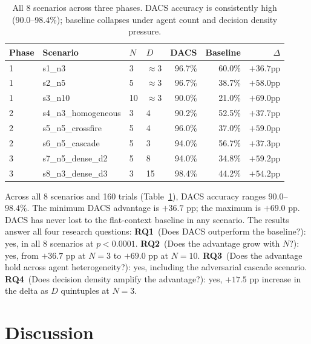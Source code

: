 \documentclass{article}
\begin{document}
\begin{table}[t]
\caption{All 8 scenarios across three phases.
DACS accuracy is consistently high (90.0--98.4\%); baseline collapses
under agent count and decision density pressure.}
\label{tab:all}
\centering
\small
\begin{tabular}{llllrrr}
\toprule
Phase & Scenario & $N$ & $D$ & DACS & Baseline & $\Delta$ \\
\midrule
1 & s1\_n3                & 3  & $\approx$3 & 96.7\% & 60.0\% & $+36.7$pp \\
1 & s2\_n5                & 5  & $\approx$3 & 96.7\% & 38.7\% & $+58.0$pp \\
1 & s3\_n10               & 10 & $\approx$3 & 90.0\% & 21.0\% & $+69.0$pp \\
2 & s4\_n3\_homogeneous   & 3  & 4          & 90.2\% & 52.5\% & $+37.7$pp \\
2 & s5\_n5\_crossfire     & 5  & 4          & 96.0\% & 37.0\% & $+59.0$pp \\
2 & s6\_n5\_cascade       & 5  & 3          & 94.0\% & 56.7\% & $+37.3$pp \\
3 & s7\_n5\_dense\_d2     & 5  & 8          & 94.0\% & 34.8\% & $+59.2$pp \\
3 & s8\_n3\_dense\_d3     & 3  & 15         & 98.4\% & 44.2\% & $+54.2$pp \\
\bottomrule
\end{tabular}
\end{table}

Across all 8 scenarios and 160 trials (Table~\ref{tab:all}), DACS
accuracy ranges $90.0$--$98.4\%$.
The minimum DACS advantage is $+36.7$ pp; the maximum is $+69.0$ pp.
DACS has never lost to the flat-context baseline in any scenario.
The results answer all four research questions:
\textbf{RQ1}~(Does DACS outperform the baseline?): yes, in all 8
scenarios at $p<0.0001$.
\textbf{RQ2}~(Does the advantage grow with $N$?): yes, from
$+36.7$ pp at $N=3$ to $+69.0$ pp at $N=10$.
\textbf{RQ3}~(Does the advantage hold across agent heterogeneity?):
yes, including the adversarial cascade scenario.
\textbf{RQ4}~(Does decision density amplify the advantage?): yes,
$+17.5$ pp increase in the delta as $D$ quintuples at $N=3$.

\section{Discussion}
\label{sec:discussion}
\end{document}
